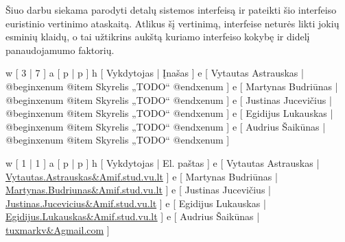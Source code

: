 
Šiuo darbu siekama parodyti detalų sistemos interfeisą ir pateikti šio interfeiso
euristinio vertinimo ataskaitą. Atlikus šį vertinimą, interfeise neturės likti
jokių esminių klaidų, o tai užtikrins aukštą kuriamo interfeiso kokybę ir didelį
panaudojamumo faktorių.

\xtable
{
  w [ 3  | 7 ]
  a [ p  | p ]
  h [ Vykdytojas | Įnašas ]
  e [ Vytautas Astrauskas
  | @begin{xenum} 
      @item Skyrelis „TODO“
    @end{xenum}
  ]
  e [ Martynas Budriūnas
  | @begin{xenum} 
      @item Skyrelis „TODO“
    @end{xenum}
  ]
  e [ Justinas Jucevičius 
  | @begin{xenum} 
      @item Skyrelis „TODO“
    @end{xenum}
  ]
  e [ Egidijus Lukauskas 
  | @begin{xenum} 
      @item Skyrelis „TODO“
    @end{xenum}
  ]
  e [ Audrius Šaikūnas 
  | @begin{xenum} 
      @item Skyrelis „TODO“
    @end{xenum}
  ]
}

\xtableu
{
  w [ 1 | 1 ]
  a [ p | p ]
  h [ Vykdytojas | El. paštas ]
  e [ Vytautas Astrauskas | \url{Vytautas.Astrauskas&Amif.stud.vu.lt} ]
  e [ Martynas Budriūnas  | \url{Martynas.Budriunas&Amif.stud.vu.lt} ]
  e [ Justinas Jucevičius | \url{Justinas.Jucevicius&Amif.stud.vu.lt} ]
  e [ Egidijus Lukauskas  | \url{Egidijus.Lukauskas&Amif.stud.vu.lt} ]
  e [ Audrius Šaikūnas    | \url{tuxmarkv&Agmail.com} ]
}
